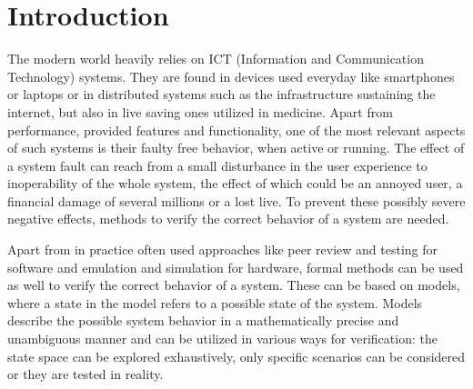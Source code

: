 \documentclass[preview]{standalone}
\begin{document}
\section{Introduction}
	
The modern world heavily relies on ICT (Information and Communication Technology) systems. They are found in devices used everyday like smartphones or laptops or in distributed systems such as the infrastructure sustaining the internet, but also in live saving ones utilized in medicine. Apart from performance, provided features and functionality, one of the most relevant aspects of such systems is their faulty free behavior, when active or running. 
The effect of a system fault can reach from a small disturbance in the user experience to inoperability of the whole system, the effect of which could be an annoyed user, a financial damage of several millions or a lost live. To prevent these possibly severe negative effects, methods to verify the correct behavior of a system are needed.


Apart from in practice often used approaches like peer review and testing for software and emulation and simulation for hardware, formal methods can be used as well to verify the correct behavior of a system. 
These can be based on models, where a state in the model refers to a possible state of the system. Models describe the possible system behavior in a mathematically precise and unambiguous manner and can be utilized in various ways for verification:
the state space can be explored exhaustively, only specific scenarios can be considered or they are tested in reality.
\end{document}
